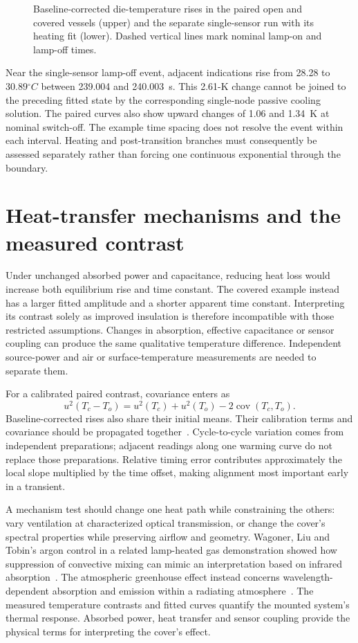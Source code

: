 \begin{figure}[t]
\centering

\caption{Baseline-corrected die-temperature rises in the paired open and covered vessels (upper) and the separate single-sensor run with its heating fit (lower). Dashed vertical lines mark nominal lamp-on and lamp-off times.}
\label{fig:greenhouse-data}
\end{figure}

Near the single-sensor lamp-off event, adjacent indications rise from 28.28 to $30.89\unit{^\circ C}$ between 239.004 and 240.003~s. This 2.61-K change cannot be joined to the preceding fitted state by the corresponding single-node passive cooling solution. The paired curves also show upward changes of 1.06 and 1.34~K at nominal switch-off. The example time spacing does not resolve the event within each interval. Heating and post-transition branches must consequently be assessed separately rather than forcing one continuous exponential through the boundary.

\section{Heat-transfer mechanisms and the measured contrast}
Under unchanged absorbed power and capacitance, reducing heat loss would increase both equilibrium rise and time constant. The covered example instead has a larger fitted amplitude and a shorter apparent time constant. Interpreting its contrast solely as improved insulation is therefore incompatible with those restricted assumptions. Changes in absorption, effective capacitance or sensor coupling can produce the same qualitative temperature difference. Independent source-power and air or surface-temperature measurements are needed to separate them.

For a calibrated paired contrast, covariance enters as
\begin{equation}
 u^2(T_c-T_o)=u^2(T_c)+u^2(T_o)-2\operatorname{cov}(T_c,T_o).
\end{equation}
Baseline-corrected rises also share their initial means. Their calibration terms and covariance should be propagated together~\cite{gum}. Cycle-to-cycle variation comes from independent preparations; adjacent readings along one warming curve do not replace those preparations. Relative timing error contributes approximately the local slope multiplied by the time offset, making alignment most important early in a transient.

A mechanism test should change one heat path while constraining the others: vary ventilation at characterized optical transmission, or change the cover's spectral properties while preserving airflow and geometry. Wagoner, Liu and Tobin's argon control in a related lamp-heated gas demonstration showed how suppression of convective mixing can mimic an interpretation based on infrared absorption~\cite{wagoner2010}. The atmospheric greenhouse effect instead concerns wavelength-dependent absorption and emission within a radiating atmosphere~\cite{pierrehumbert2011}. The measured temperature contrasts and fitted curves quantify the mounted system's thermal response. Absorbed power, heat transfer and sensor coupling provide the physical terms for interpreting the cover's effect.
